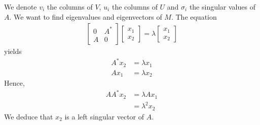 \documentclass[a4paper,oneside]{book}
\numberwithin{equation}{chapter}
\begin{document}
We denote $v_i$ the columns of $V$, $u_i$ the columns of $U$ and $\sigma _i$ the singular values of $A$. We want to find eigenvalues and eigenvectors of $M$. The equation
\begin{align}
\left[ {\begin{array}{*{20}{c}}
0&{{A^*}}\\
A&0
\end{array}} \right]\left[ {\begin{array}{*{20}{c}}
{{x_1}}\\
{{x_2}}
\end{array}} \right] = \lambda \left[ {\begin{array}{*{20}{c}}
{{x_1}}\\
{{x_2}}
\end{array}} \right]
\end{align}
yields
\begin{align}
{A^*}{x_2} &= \lambda {x_1}\\
A{x_1} &= \lambda {x_2}
\end{align}
Hence, 
\begin{align}
A{A^*}{x_2} &= \lambda A{x_1}\\
 &= {\lambda ^2}{x_2}
\end{align} 
We deduce that $x_2$ is a left singular vector of $A$.\\
\end{document}
